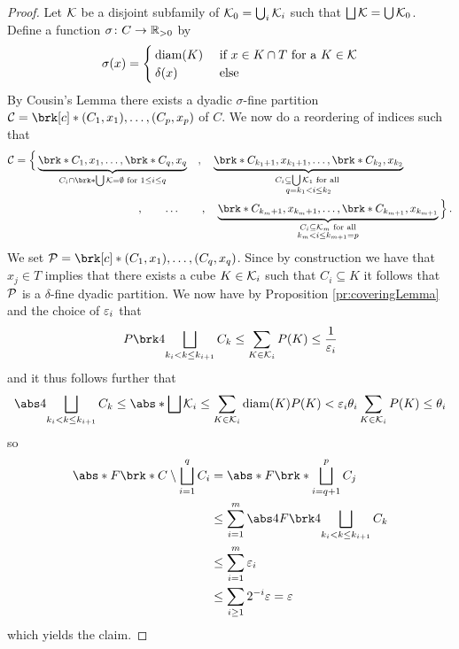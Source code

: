 \begin{proof}
Let $\mathcal{K}$ be a disjoint subfamily of $\mathcal{K}_0=\bigcup_i\mathcal{K}_i$ such that $\bigsqcup\mathcal{K}=\bigcup\mathcal{K}_0$. Define a function $\sigma\colon C\to \mathbb{R}_{>0}$ by
\begin{align*}
	\sigma(x)=\begin{cases}
		\operatorname{diam}(K)&\text{ if }x\in K\cap T\text{ for a }K\in\mathcal{K}\\
		\delta(x) &\text{ else}
	\end{cases}
\end{align*}
By Cousin's Lemma there exists a dyadic $\sigma$-fine partition $\cC=\brk[c]*{(C_1,x_1),\dots,(C_p,x_p)}$ of $C$.
 We now do a reordering of indices such that
\begin{align*}
	\cC=\Big\{\underbrace{\brk*{C_1,x_1},\dots,\brk*{C_q,x_q}}_{C_i\cap\brk*{\bigcup\cK}=\emptyset\text{ for }1\leq i\leq q}\quad,\quad \underbrace{\brk*{C_{k_1+1},x_{k_1+1}},\dots,\brk*{C_{k_2},x_{k_2}}}_{\substack{C_i\subseteq \bigcup\cK_1 \text{ for all } \\ q=k_1< i\leq k_2}}\qquad\qquad&\\
	\qquad\qquad,\qquad\dots\qquad,\quad \underbrace{\brk*{C_{k_m+1},x_{k_m+1}},\dots,\brk*{C_{k_{m+1}},x_{k_{m+1}}}}_{\substack{C_i\subseteq \cK_m \text{ for all}\\  k_m< i\leq k_{m+1}=p}}\Big\}&\,.
\end{align*}
We set $\cP=\brk[c]*{(C_1,x_1),\dots,(C_q,x_q)}$. Since by construction we have that $x_j\in T$ implies that there exists a cube $K\in\mathcal{K}_i$ such that $C_i\subseteq K$ it follows that $\mathcal{P}$ is a $\delta$-fine dyadic partition.
We now have by Proposition \ref{pr:coveringLemma} and the choice of $\varepsilon_i$ that
\begin{align*}
	P\brk4{\bigsqcup_{k_i<k\leq k_{i+1}}C_k}
	\leq \sum_{K\in\cK_i}P(K)
	\leq \frac{1}{\e_i}
\end{align*}
and it thus follows further that
\begin{align*}
	\abs4{\bigsqcup_{k_i<k\leq k_{i+1}}C_k}
	\leq \abs*{\bigsqcup\cK_i}
	\leq \sum_{K\in\cK_i}\diam(K)P(K)
	<\e_i\theta_i\sum_{K\in\cK_i}P(K)\leq \theta_i
\end{align*}
so
\begin{align*}
	\abs*{F\brk*{C\setminus\bigsqcup_{i=1}^q C_i}}
	&=\abs*{F\brk*{\bigsqcup_{i=q+1}^p C_j}} \\
	&\leq \sum_{i=1}^m\abs4{F\brk4{\bigsqcup_{k_i<k\leq k_{i+1}}C_k}} \\
	&\leq \sum_{i=1}^m\e_i \\
	&\leq \sum_{i\geq 1}2^{-i}\e=\e
\end{align*}
which yields the claim.
\end{proof}

